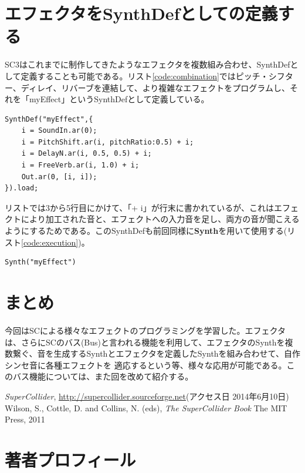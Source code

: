 \documentclass{jsarticle}
\begin{document}
\section{エフェクタをSynthDefとしての定義する}
SC3はこれまでに制作してきたようなエフェクタを複数組み合わせ、SynthDefとして定義することも可能である。リスト\ref{code:combination}ではピッチ・シフター、ディレイ、リバーブを連結して、より複雑なエフェクトをプログラムし、それを「myEffect」というSynthDefとして定義している。

\begin{lstlisting}[caption=エフェクトのSynthDef, label=code:combination]
SynthDef("myEffect",{
	i = SoundIn.ar(0);
	i = PitchShift.ar(i, pitchRatio:0.5) + i;
	i = DelayN.ar(i, 0.5, 0.5) + i;
	i = FreeVerb.ar(i, 1.0) + i;
	Out.ar(0, [i, i]);
}).load;
\end{lstlisting}

リストでは3から5行目にかけて、「+ i」が行末に書かれているが、これはエフェクトにより加工された音と、エフェクトへの入力音を足し、両方の音が聞こえるようにするためである。このSynthDefも前回同様に{\bf Synth}を用いて使用する(リスト\ref{code:execution})。

\begin{lstlisting}[caption=エフェクトSynthDefの使用, label=code:execution]
Synth("myEffect")
\end{lstlisting}

\section{まとめ}
今回はSCによる様々なエフェクトのプログラミングを学習した。エフェクタは、さらにSCのバス(Bus)と言われる機能を利用して、エフェクタのSynthを複数繋ぐ、音を生成するSynthとエフェクタを定義したSynthを組み合わせて、自作シンセ音に各種エフェクトを
適応するという等、様々な応用が可能である。このバス機能については、また回を改めて紹介する。


\begin{thebibliography}{citations}
   {\it SuperCollider}, \url{http://supercollider.sourceforge.net}(アクセス日 2014年6月10日)
   Wilson, S., Cottle, D. and Collins, N. (eds), {\it The SuperCollider Book} The MIT Press, 2011

\end{thebibliography}

\section{著者プロフィール}
\end{document}
